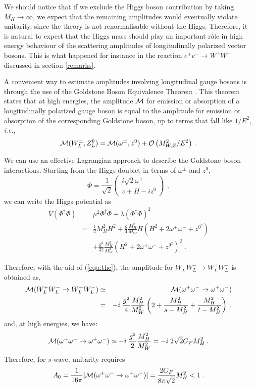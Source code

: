\documentclass[12pt]{report}
\newcommand{\ba}{\begin{array}}
\newcommand{\ea}{\end{array}}
\begin{document}
We should notice that if we exclude the Higgs boson contribution by
taking $M_H \to \infty$, we expect that the remaining amplitudes
would eventually violate unitarity, since the theory is not
renormalisable without the Higgs. Therefore, it is natural to expect
that the Higgs mass should play an important r\^ole in high energy
behaviour of the scattering amplitudes of longitudinally polarized
vector bosons. This is what happened for instance in the reaction
$e^+e^- \to W^+ W^-$ discussed in section \ref{remarks}.

A convenient way to estimate amplitudes involving longitudinal gau\-ge
bosons is through the use of the Goldstone Boson Equivalence
Theorem \cite{Lee:77,Chanowitz:85}.
This theorem states that at high energies, the amplitude ${\cal M}$
for emission or absorption of a longitudinally polarized gauge boson
is equal to the amplitude for emission or absorption of the
corresponding Goldstone boson, up to terms that fall like $1/E^2$,
{\it i.e.},
\begin{equation}
{\cal M}(W^\pm_L, Z^0_L) = {\cal M} (\omega^\pm, z^0) + 
{\cal O} \left( M_{W,Z}^2/E^2 \right) \; .
\label{equ:the}
\end{equation}

We can use an effective Lagrangian approach to describe the Goldstone
boson interactions. Starting from the Higgs doublet in terms of
$\omega^\pm$ and $z^0$,
\[
\Phi =
\frac{1}{\sqrt{2}}
                        \left( \ba{c}
                        i\sqrt{2} \omega^+\\
                        v + H - i z^0
                         \ea \right) \; ,
\]
we can write the Higgs potential as
\begin{eqnarray*} 
V(\Phi^\dagger\Phi) &=& \mu^2 \Phi^\dagger\Phi + \lambda (\Phi^\dagger\Phi)^2
\\
&=& \frac{1}{2} M_H^2 H^2 + \frac{g}{4} \frac{M_H^2}{M_W} H ( H^2
+ 2 \omega^+ \omega^- + z^{0^2}) \\
&& + \frac{g^2}{32} \frac{M_H^2}{M_W^2} ( H^2 + 2 \omega^+
\omega^- + z^{0^2})^2 \; .
\end{eqnarray*}

Therefore, with the aid of (\ref{equ:the}), the amplitude for $W^+_L
W^-_L  \to W^+_L  W^-_L$ is obtained as,
\begin{eqnarray*}
{\cal M} (W^+_L W^-_L  \to W^+_L  W^-_L) &\simeq&  
{\cal M} (\omega^+ \omega^- \to \omega^+ \omega^-) 
\\
&=& - i \; \frac{g^2}{4}
\frac{M_H^2}{M_W^2}  \left( 2 + \frac{M_H^2}{s - M_H^2} +
\frac{M_H^2}{t - M_H^2} \right) \; .
\end{eqnarray*}
and, at high energies, we have:
\[
{\cal M} (\omega^+ \omega^- \to \omega^+ \omega^-) \simeq 
- i \; \frac{g^2}{2} \frac{M_H^2}{M_W^2} = 
- i \; 2 \sqrt{2} G_F M_H^2 \; .
\]
Therefore, for $s$-wave, unitarity requires
\[
A_0 = \frac{1}{16\pi} |{\cal M}(\omega^+ \omega^- \to \omega^+
\omega^-)| = \frac{2 G_F}{8 \pi \sqrt{2}} M_H^2 < 1 \; .
\]
\end{document}
